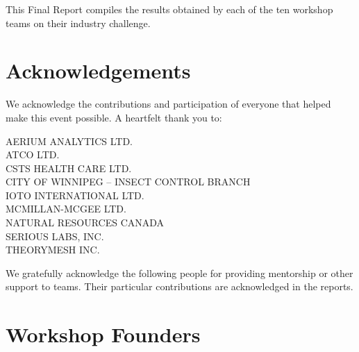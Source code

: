 \documentclass[11pt]{report}
\begin{document}
This  Final Report compiles the results obtained by each of the ten
workshop teams on their industry challenge.   


\newpage

\section*{Acknowledgements}
We acknowledge the contributions and participation of everyone that helped make
this event possible.  A heartfelt thank you to: 


\noindent\hrulefill

\begin{multicols}{2}
    \begin{flushleft}
        \uppercase{Aerium Analytics Ltd.} \\
        \uppercase{ATCO Ltd.} \\
        \uppercase{CSTS Health Care Ltd.} \\
        \uppercase{City of Winnipeg -- Insect Control Branch} \\
        \uppercase{IOTO International Ltd.} \\
        \uppercase{McMillan-McGee Ltd.} \\
        \uppercase{Natural Resources Canada} \\
        \uppercase{Serious Labs, Inc.} \\
        \uppercase{TheoryMesh Inc.}
    \end{flushleft}
 \end{multicols}

\noindent\hrulefill

We gratefully acknowledge the following people for providing mentorship or
other support to \mtopi teams. Their particular contributions are acknowledged
in the reports.

\noindent\hrulefill

\section*{Workshop Founders}
\begin{multicols}{2}
    \begin{flushleft} 
         \\
        \columnbreak
    \end{flushleft}
\end{multicols}
\end{document}
